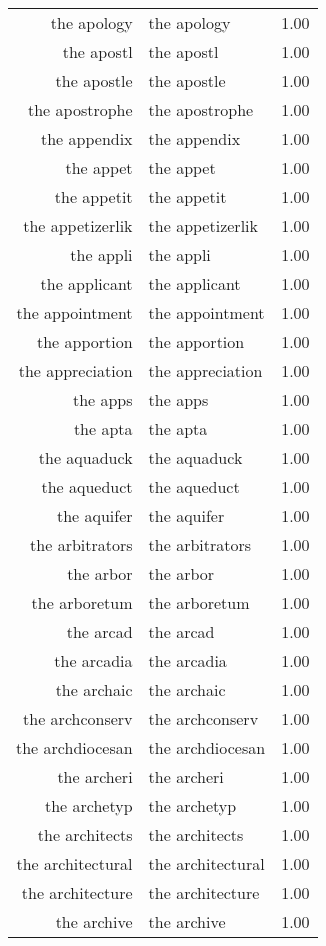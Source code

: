 \begin{table}[ht]
\begin{tabular}{rlr}
  the apology & the apology & 1.00 \\ 
  the apostl & the apostl & 1.00 \\ 
  the apostle & the apostle & 1.00 \\ 
  the apostrophe & the apostrophe & 1.00 \\ 
  the appendix & the appendix & 1.00 \\ 
  the appet & the appet & 1.00 \\ 
  the appetit & the appetit & 1.00 \\ 
  the appetizerlik & the appetizerlik & 1.00 \\ 
  the appli & the appli & 1.00 \\ 
  the applicant & the applicant & 1.00 \\ 
  the appointment & the appointment & 1.00 \\ 
  the apportion & the apportion & 1.00 \\ 
  the appreciation & the appreciation & 1.00 \\ 
  the apps & the apps & 1.00 \\ 
  the apta & the apta & 1.00 \\ 
  the aquaduck & the aquaduck & 1.00 \\ 
  the aqueduct & the aqueduct & 1.00 \\ 
  the aquifer & the aquifer & 1.00 \\ 
  the arbitrators & the arbitrators & 1.00 \\ 
  the arbor & the arbor & 1.00 \\ 
  the arboretum & the arboretum & 1.00 \\ 
  the arcad & the arcad & 1.00 \\ 
  the arcadia & the arcadia & 1.00 \\ 
  the archaic & the archaic & 1.00 \\ 
  the archconserv & the archconserv & 1.00 \\ 
  the archdiocesan & the archdiocesan & 1.00 \\ 
  the archeri & the archeri & 1.00 \\ 
  the archetyp & the archetyp & 1.00 \\ 
  the architects & the architects & 1.00 \\ 
  the architectural & the architectural & 1.00 \\ 
  the architecture & the architecture & 1.00 \\ 
  the archive & the archive & 1.00 \\ 

\end{tabular}
\end{table}
